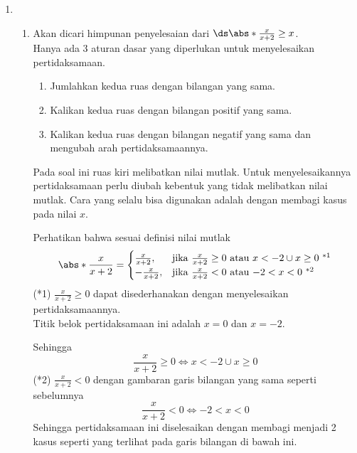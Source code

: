 \begin{enumerate}[leftmargin=*, label={\arabic*}.]
\item
\begin{enumerate}[label={\alph*}.]
    \item Akan dicari himpunan penyelesaian dari 
    $\ds \abs*{\frac{x}{x+2}} \geq x$.\\
    Hanya ada 3 aturan dasar yang diperlukan untuk menyelesaikan pertidaksamaan.
    \begin{enumerate}[label={\arabic*})]
        \item Jumlahkan kedua ruas dengan bilangan yang sama.
        \item Kalikan kedua ruas dengan bilangan positif yang sama.
        \item Kalikan kedua ruas dengan bilangan negatif yang sama dan 
        mengubah arah pertidaksamaannya.
    \end{enumerate}
    Pada soal ini ruas kiri melibatkan nilai mutlak. Untuk menyelesaikannya 
    pertidaksamaan perlu diubah kebentuk yang tidak melibatkan nilai mutlak. 
    Cara yang selalu bisa digunakan adalah dengan membagi kasus pada nilai $x$.
        
    Perhatikan bahwa sesuai definisi nilai mutlak
    \[
    \abs*{\frac{x}{x+2}} = 
    \begin{cases}
        \frac{x}{x+2}, &\text{jika $\frac{x}{x+2} \geq 0$ atau $x < -2 \cup x \geq 0$ $^{*1}$}\\
        -\frac{x}{x+2}, &\text{jika $\frac{x}{x+2} < 0$ atau $-2 < x < 0$ $^{*2}$}
    \end{cases}
    \]
    (*1) $\frac{x}{x+2} \geq 0$ dapat disederhanakan dengan menyelesaikan 
    pertidaksamaannya. \\Titik belok pertidaksamaan ini adalah $x= 0$ dan $x=-2$.
    \begin{center}
    \end{center}
    Sehingga
    \[
        \frac{x}{x+2} \geq 0 \iff x < -2 \cup x \geq 0
    \]
    (*2) $\frac{x}{x+2} < 0$ dengan gambaran garis bilangan yang sama seperti sebelumnya
    \[
        \frac{x}{x+2} < 0 \iff -2 < x < 0
    \]
    Sehingga pertidaksamaan ini diselesaikan dengan membagi menjadi 2 kasus seperti 
yang terlihat pada garis bilangan di bawah ini.


\end{enumerate}
\end{enumerate}

